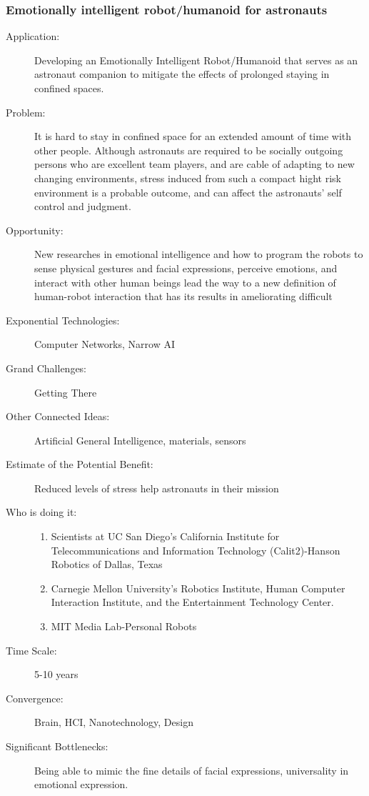  
\subsubsection{Emotionally  intelligent robot/humanoid for astronauts}
\begin{description}  \item[Application:] Developing an Emotionally Intelligent  Robot/Humanoid that serves as an astronaut companion to mitigate the  effects of prolonged staying in confined spaces.
\item[Problem:]  It is hard to stay in confined space for an extended amount of time  with other people. Although astronauts are required to be socially  outgoing persons who are excellent team players, and are cable of  adapting to new changing environments, stress induced from such a  compact hight risk environment is a probable outcome, and can affect the  astronauts' self control and judgment.
\item[Opportunity:]  New researches in emotional intelligence and how to program the robots  to sense physical gestures and facial expressions, perceive emotions,  and interact with other human beings lead the way to a new definition of  human-robot interaction that has its results in ameliorating difficult 
\item[Exponential  Technologies:] Computer Networks, Narrow AI
\item[Grand  Challenges:] Getting There
\item[Other Connected Ideas:]  Artificial General Intelligence, materials, sensors
\item[Estimate  of the Potential Benefit:] Reduced levels of stress help astronauts in  their mission
\item[Who is doing it:]
\hfill\begin{enumerate}
\item Scientists at UC San Diego's  California Institute for Telecommunications and Information Technology  (Calit2)-Hanson Robotics of Dallas, Texas
\item Carnegie Mellon University's Robotics  Institute, Human Computer Interaction Institute, and the Entertainment  Technology Center.
\item MIT Media Lab-Personal Robots
\end{enumerate}
\item[Time Scale:] 5-10 years
\item[Convergence:]  Brain, HCI, Nanotechnology, Design
\item[Significant  Bottlenecks:] Being able to mimic the fine details of facial  expressions, universality in emotional expression.
\end{description}
 

